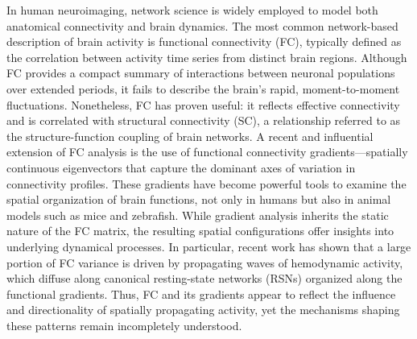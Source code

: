 \documentclass{article}
\begin{document}
In human neuroimaging, network science is widely employed to model both anatomical connectivity and brain dynamics\cite{bassett2017network}. The most common network-based description of brain activity is functional connectivity (FC), typically defined as the correlation between activity time series from distinct brain regions. Although FC provides a compact summary of interactions between neuronal populations over extended periods, it fails to describe the brain’s rapid, moment-to-moment fluctuations\cite{zamani2020high}. Nonetheless, FC has proven useful: it reflects effective connectivity and is correlated with structural connectivity (SC), a relationship referred to as the structure-function coupling of brain networks\cite{fotiadis2024structure}. A recent and influential extension of FC analysis is the use of functional connectivity gradients---spatially continuous eigenvectors that capture the dominant axes of variation in connectivity profiles\cite{margulies2016situating, huntenburg2018large, bernhardt2022gradients}. These gradients have become powerful tools to examine the spatial organization of brain functions, not only in humans but also in animal models such as mice and zebrafish\cite{coletta2020network, legare2024structural}. While gradient analysis inherits the static nature of the FC matrix, the resulting spatial configurations offer insights into underlying dynamical processes. In particular, recent work has shown that a large portion of FC variance is driven by propagating waves of hemodynamic activity, which diffuse along canonical resting-state networks (RSNs) organized along the functional gradients\cite{yousefi2021propagating, raut2021global}. Thus, FC and its gradients appear to reflect the influence and directionality of spatially propagating activity, yet the mechanisms shaping these patterns remain incompletely understood.
\end{document}
